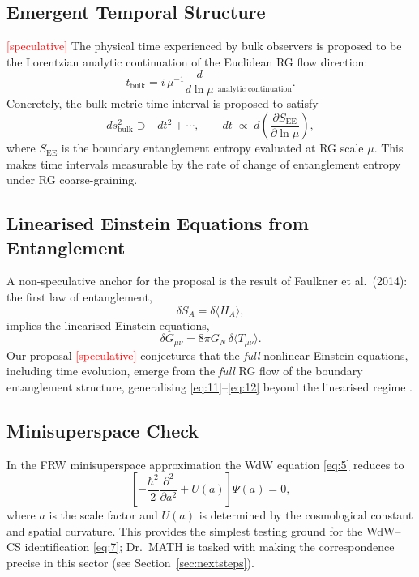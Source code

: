 \documentclass[11pt,a4paper]{article}
\begin{document}
\subsection{Emergent Temporal Structure}

\textcolor{red}{[speculative]}
The physical time experienced by bulk observers is proposed to be the
Lorentzian analytic continuation of the Euclidean RG flow direction:
\begin{equation}\label{eq:9}
  t_{\text{bulk}} = i\,\mu^{-1}\frac{d}{d\ln\mu}
    \bigg|_{\text{analytic continuation}}.
\end{equation}
Concretely, the bulk metric time interval is proposed to satisfy
\begin{equation}\label{eq:10}
  ds^2_{\text{bulk}} \supset -dt^2 + \cdots,
  \qquad
  dt \;\propto\; d\!\left(\frac{\partial S_{\text{EE}}}{\partial\ln\mu}\right),
\end{equation}
where $S_{\text{EE}}$ is the boundary entanglement entropy evaluated at RG
scale $\mu$.
This makes time intervals measurable by the rate of change of entanglement
entropy under RG coarse-graining.

\subsection{Linearised Einstein Equations from Entanglement}

A non-speculative anchor for the proposal is the result of Faulkner et al.\
(2014): the first law of entanglement,
\begin{equation}\label{eq:11}
  \delta S_A = \delta\langle H_A \rangle,
\end{equation}
implies the linearised Einstein equations,
\begin{equation}\label{eq:12}
  \delta G_{\mu\nu} = 8\pi G_N\,\delta\langle T_{\mu\nu}\rangle.
\end{equation}
Our proposal \textcolor{red}{[speculative]} conjectures that the \emph{full}
nonlinear Einstein equations, including time evolution, emerge from the
\emph{full} RG flow of the boundary entanglement structure, generalising
\eqref{eq:11}--\eqref{eq:12} beyond the linearised regime \cite{maldacena1997,witten1998}.

\subsection{Minisuperspace Check}

In the FRW minisuperspace approximation the WdW equation \eqref{eq:5}
reduces to
\begin{equation}\label{eq:13}
  \left[
    -\frac{\hbar^2}{2}\frac{\partial^2}{\partial a^2} + U(a)
  \right]\Psi(a) = 0,
\end{equation}
where $a$ is the scale factor and $U(a)$ is determined by the cosmological
constant and spatial curvature.
This provides the simplest testing ground for the WdW--CS identification
\eqref{eq:7}; Dr.\ MATH is tasked with making the correspondence precise in
this sector (see Section~\ref{sec:nextsteps}).
\end{document}
